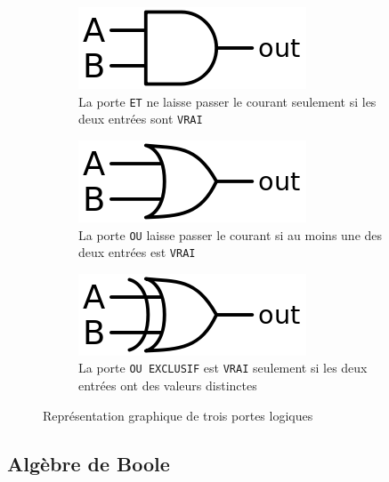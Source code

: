     
    \begin{figure}
    \begin{subfigure}{.3\textwidth}
    \centering
    \includegraphics[width=0.80\linewidth]{images/processeur_porte_et.png}
    \caption{La porte \texttt{ET} ne laisse passer le courant seulement si les deux entrées sont \texttt{VRAI}}
    \end{subfigure}\hfill
    \begin{subfigure}{.3\textwidth}
    \centering
    \includegraphics[width=0.80\linewidth]{images/processeur_porte_ou.png}
    \caption{La porte \texttt{OU} laisse passer le courant si au moins une des deux entrées est \texttt{VRAI}}
    \end{subfigure}\hfill
    \begin{subfigure}{.3\textwidth}
    \centering
    \includegraphics[width=0.80\linewidth]{images/processeur_porte_oux.png}
    \caption{La porte \texttt{OU EXCLUSIF} est \texttt{VRAI} seulement si les deux entrées ont des valeurs distinctes}
    \end{subfigure}
    \caption{Représentation graphique de trois portes logiques \cite{Wikipedia2019Porte}}
    \label{pic:processeur_portes}
    \end{figure}




\subsection{Algèbre de Boole}

